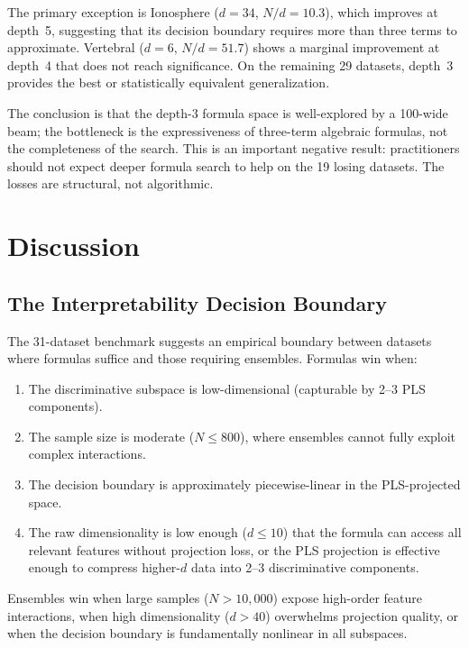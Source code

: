 \documentclass[journal]{IEEEtran}
\begin{document}
The primary exception is Ionosphere ($d = 34$, $N/d = 10.3$), which
improves at depth~5, suggesting that its decision boundary requires
more than three terms to approximate.  Vertebral ($d = 6$,
$N/d = 51.7$) shows a marginal improvement at depth~4 that does
not reach significance.  On the remaining 29 datasets, depth~3
provides the best or statistically equivalent generalization.

The conclusion is that the depth-3 formula space is well-explored
by a 100-wide beam; the bottleneck is the expressiveness of
three-term algebraic formulas, not the completeness of the search.
This is an important negative result: practitioners should not
expect deeper formula search to help on the 19 losing datasets.
The losses are structural, not algorithmic.

\section{Discussion}

\subsection{The Interpretability Decision Boundary}
\label{sec:boundary}

The 31-dataset benchmark suggests an empirical boundary between
datasets where formulas suffice and those requiring ensembles.
Formulas win when:
\begin{enumerate}
\item The discriminative subspace is low-dimensional (capturable by
2--3 PLS components).
\item The sample size is moderate ($N \leq 800$), where ensembles
cannot fully exploit complex interactions.
\item The decision boundary is approximately piecewise-linear in the
PLS-projected space.
\item The raw dimensionality is low enough ($d \leq 10$) that the
formula can access all relevant features without projection loss,
or the PLS projection is effective enough to compress higher-$d$
data into 2--3 discriminative components.
\end{enumerate}
Ensembles win when large samples ($N > 10{,}000$) expose high-order
feature interactions, when high dimensionality ($d > 40$) overwhelms
projection quality, or when the decision boundary is fundamentally
nonlinear in all subspaces.
\end{document}
